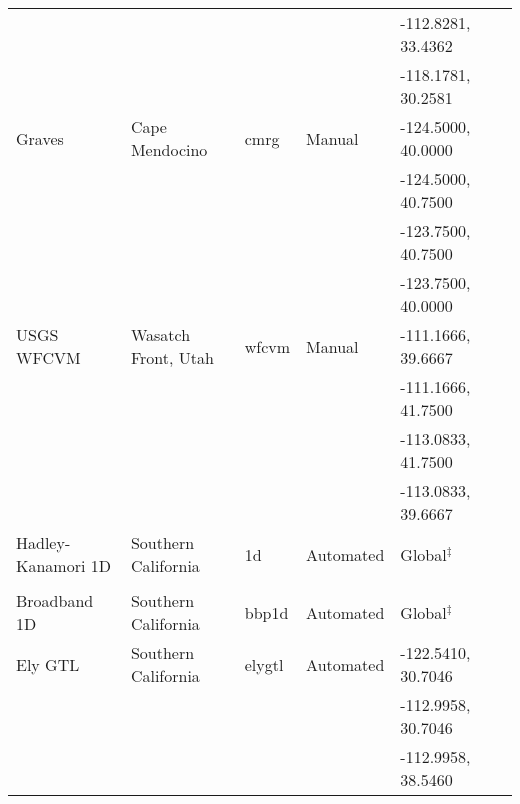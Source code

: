 \begin{table*}
\begin{tabular}[]{llllll}
                   &                       &               &              & -112.8281, 33.4362 &                              \\
                   &                       &               &              & -118.1781, 30.2581 &                              \\
Graves             & Cape Mendocino        & cmrg          &  Manual      & -124.5000, 40.0000 & \citet{Graves_1994_SSA}      \\
                   &                       &               &              & -124.5000, 40.7500 &                              \\
                   &                       &               &              & -123.7500, 40.7500 &                              \\
                   &                       &               &              & -123.7500, 40.0000 &                              \\
USGS WFCVM         & Wasatch Front, Utah   & wfcvm         &  Manual      & -111.1666, 39.6667 & \citet{Magistrale_2006_Tech} \\
                   &                       &               &              & -111.1666, 41.7500 &                              \\
                   &                       &               &              & -113.0833, 41.7500 &                              \\
                   &                       &               &              & -113.0833, 39.6667 &                              \\
Hadley-Kanamori 1D & Southern California   & 1d            &  Automated   & Global$^\ddagger$  & \citet{Kanamori_1975_Chap}   \\
                   &                       &               &              &                    & \citet{Hadley_1977_GSAB}     \\
Broadband 1D       & Southern California   & bbp1d         &  Automated   & Global$^\ddagger$  & \citet{Graves_2010_BSSA}     \\
Ely GTL            & Southern California   & elygtl        &  Automated   & -122.5410, 30.7046 & \citet{Ely_2010_AGU}         \\
                   &                       &               &              & -112.9958, 30.7046 &                              \\
                   &                       &               &              & -112.9958, 38.5460 &                              \\

\end{tabular}
\end{table*}

